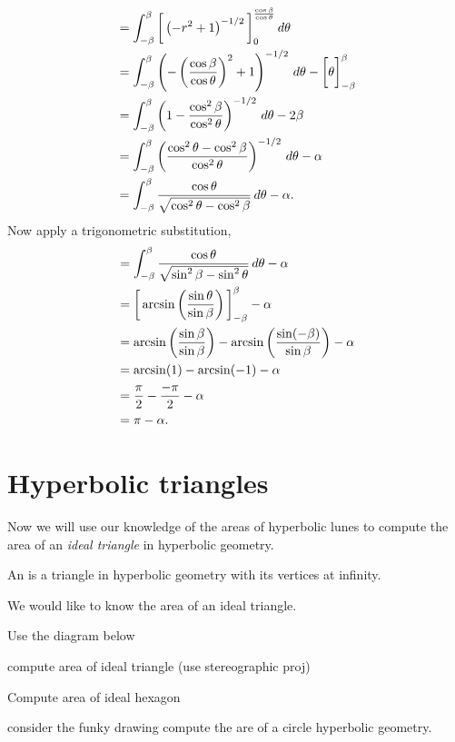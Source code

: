 \documentclass{ximera}
\begin{document}
\begin{problem}
\begin{freeResponse}
\begin{align*}
      &= \int_{-\beta}^\beta \bigg[ \left(-r^2+1\right)^{-1/2} \bigg]_0^{\frac{\cos \beta}{\cos\theta}}\,d \theta\\
      &= \int_{-\beta}^\beta \left(-\left(\frac{\cos \beta}{\cos\theta}\right)^2+1\right)^{-1/2}\,d\theta - \bigg[ \theta \bigg]_{-\beta}^\beta\\
      &= \int_{-\beta}^\beta \left(1-\frac{\cos^2 \beta}{\cos^2\theta}\right)^{-1/2}\,d \theta -2\beta\\
      &= \int_{-\beta}^\beta \left(\frac{\cos^2\theta - \cos^2 \beta}{\cos^2\theta}\right)^{-1/2} \,d \theta-\alpha\\
      &= \int_{-\beta}^\beta \frac{\cos\theta}{\sqrt{\cos^2\theta - \cos^2 \beta}}\,d \theta - \alpha.
    \end{align*}
    Now apply a trigonometric substitution,
    \begin{align*}
      &= \int_{-\beta}^\beta \frac{\cos\theta}{\sqrt{\sin^2\beta - \sin^2 \theta}}\,d \theta- \alpha\\
      &= \bigg[ \arcsin\left(\frac{\sin\theta}{\sin\beta}\right) \bigg]_{-\beta}^\beta - \alpha\\
      &= \arcsin\left(\frac{\sin\beta}{\sin\beta}\right)- \arcsin\left(\frac{\sin(-\beta)}{\sin\beta}\right)- \alpha\\
      &= \arcsin(1)-\arcsin(-1)-\alpha\\
      &= \frac{\pi}{2}-\frac{-\pi}{2}-\alpha\\
      &= \pi-\alpha.
    \end{align*}
  \end{freeResponse}
\end{problem}


\section{Hyperbolic triangles}

Now we will use our knowledge of the areas of hyperbolic lunes to
compute the area of an \textit{ideal triangle} in hyperbolic geometry.

\begin{definition}
  An  is a triangle in hyperbolic geometry with
  its vertices at infinity.
\end{definition}

We would like to know the area of an ideal triangle.

\begin{problem}
  
\end{problem}

Use the diagram below 


compute area of ideal triangle (use stereographic proj)

Compute area of ideal hexagon

consider the funky drawing
compute the are of a circle hyperbolic geometry.
\end{document}
